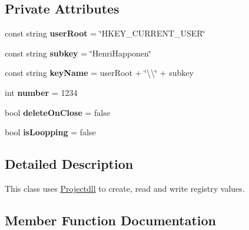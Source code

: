\subsection*{Private Attributes}
\begin{DoxyCompactItemize}
\item 
\mbox{\label{class_final_work_1_1_program_af5256eaacdc08351e6f094cc61fe17ad}} 
const string {\bfseries user\+Root} = \char`\"{}H\+K\+E\+Y\+\_\+\+C\+U\+R\+R\+E\+N\+T\+\_\+\+U\+S\+ER\char`\"{}
\item 
\mbox{\label{class_final_work_1_1_program_ab7edbbc57b05ff2b3b4244bc9715b1de}} 
const string {\bfseries subkey} = \char`\"{}Henri\+Happonen\char`\"{}
\item 
\mbox{\label{class_final_work_1_1_program_a13d692585fb81bc08eb934a225b42712}} 
const string {\bfseries key\+Name} = user\+Root + \char`\"{}\textbackslash{}\textbackslash{}\char`\"{} + subkey
\item 
\mbox{\label{class_final_work_1_1_program_a74fe3d13e264de40f5db7c83214b4806}} 
int {\bfseries number} = 1234
\item 
\mbox{\label{class_final_work_1_1_program_ac71abcc0b5f84c1c6babdecca0be086c}} 
bool {\bfseries delete\+On\+Close} = false
\item 
\mbox{\label{class_final_work_1_1_program_a4d377bfc0889c26cdee3918f74219056}} 
bool {\bfseries is\+Loopping} = false
\end{DoxyCompactItemize}


\subsection{Detailed Description}
This class uses \hyperlink{namespace_projectdll}{Projectdll} to create, read and write registry values. 

\subsection{Member Function Documentation}
\mbox{\label{class_final_work_1_1_program_a479f55810ed808f361519bcac3b0d205}} 
